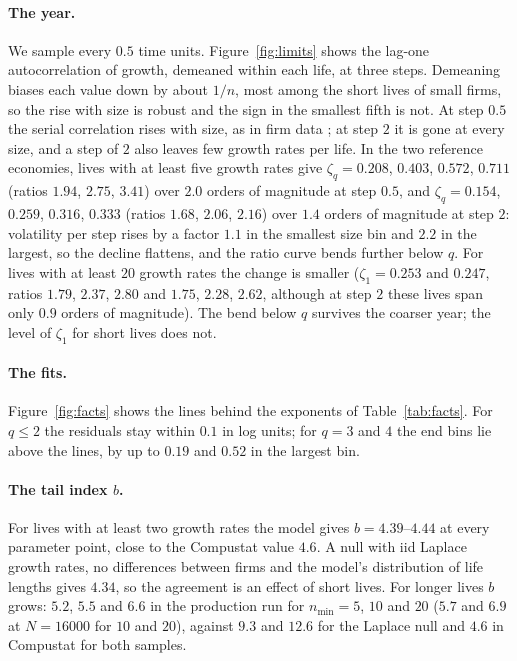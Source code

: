 \documentclass[pre,twocolumn,superscriptaddress,nofootinbib]{revtex4-2}
\begin{document}
\paragraph{The year.}  We sample every $0.5$ time units.  Figure~\ref{fig:limits} shows the lag-one
autocorrelation of growth, demeaned within each life, at three steps.  Demeaning biases each value down by
about $1/n$, most among the short lives of small firms, so the rise with size is robust and the sign in the
smallest fifth is not.  At step $0.5$ the serial correlation rises with size, as in firm data
\cite{coad2007}; at step $2$ it is gone at every size, and a step of $2$ also leaves few growth rates per life.  In the two reference economies, lives with at least five
growth rates give $\zeta_q=0.208$, $0.403$, $0.572$, $0.711$ (ratios $1.94$, $2.75$, $3.41$) over $2.0$
orders of magnitude at step $0.5$, and $\zeta_q=0.154$, $0.259$, $0.316$, $0.333$ (ratios $1.68$, $2.06$, $2.16$) over
$1.4$ orders of magnitude at step $2$: volatility per step rises by a factor $1.1$ in the smallest size bin and $2.2$
in the largest, so the decline flattens, and the ratio curve bends further below $q$.  For lives with
at least $20$ growth rates the change is smaller ($\zeta_1=0.253$ and $0.247$, ratios $1.79$, $2.37$,
$2.80$ and $1.75$, $2.28$, $2.62$, although at step $2$ these lives span only $0.9$ orders of magnitude).  The bend
below $q$ survives the coarser year; the level of $\zeta_1$ for short lives does not.

\paragraph{The fits.}  Figure~\ref{fig:facts} shows the lines behind the exponents of Table~\ref{tab:facts}.  For
$q\le2$ the residuals stay within $0.1$ in log units; for $q=3$ and $4$ the end bins lie above the lines, by up
to $0.19$ and $0.52$ in the largest bin.

\paragraph{The tail index $b$.}  For lives with at least two growth rates the model gives
$b=4.39$--$4.44$ at every parameter point, close to the Compustat value $4.6$.  A null with iid Laplace
growth rates, no differences between firms and the model's distribution of life lengths gives
$4.34$, so the agreement is an effect of short lives.  For longer lives $b$ grows: $5.2$, $5.5$ and $6.6$ in the production
run for $n_{\min}=5$, $10$ and $20$ ($5.7$ and $6.9$ at $N=16000$ for $10$ and $20$), against $9.3$ and $12.6$ for the Laplace null and $4.6$ in
Compustat for both samples.
\end{document}
